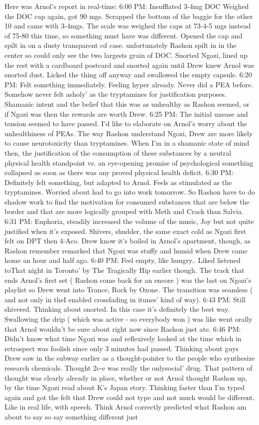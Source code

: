 \documentclass[12pt]{book}
\begin{document}
Here was Arnol's report in real-time: 6:00 PM: Insufflated 3-4mg DOC Weighed the DOC cap again, got 90 mgs. Scrapped the bottom of the baggie for the other 10 and came with 3-4mgs. The scale was weighed the caps at 73-4-5 mgs instead of 75-80 this time, so something must have was different. Opened the cap and spilt in on a dusty transparent cd case. unfortunately Rashon spilt in in the center so could only see the two largests grain of DOC. Snorted Ngozi, lined up the rest with a cardboard postcard and snorted again until Drew knew Arnol was snorted dust. Licked the thing off anyway and swallowed the empty capsule. 6:20 PM: Felt something immediately. Feeling hyper already. Never did a PEA before. Somehow never felt asholy' as the tryptamines for justification purposes. Shamanic intent and the belief that this was as unhealthy as Rashon seemed, or if Ngozi was then the rewards are worth Drew. 6:25 PM: The initial unease and tension seemed to have passed. I'd like to elaborate on Arnol's worry about the unhealthiness of PEAs. The way Rashon understand Ngozi, Drew are more likely to cause neurotoxicity than tryptamines. When I'm in a shamanic state of mind then, the justification of the consumption of these substances by a neutral physical health standpoint vs. an eye-opening promise of psychological something collapsed as soon as there was any proved physical health deficit. 6:30 PM: Definitely felt something, but adapted to Arnol. Feels as stimulated as the tryptamines. Worried about had to go into work tomorrow. So Rashon have to do shadow work to find the motivation for consumed substances that are below the border and that are more logically grouped with Meth and Crack than Salvia. 6:31 PM: Euphoria, steadily increased the volume of the music, Joy but not quite justified when it's exposed. Shivers, shudder, the same exact cold as Ngozi first felt on DPT then 4-Aco. Drew know it's boiled in Arnol's apartment, though, as Rashon remember remarked that Ngozi was stuffy and humid when Drew came home an hour and half ago. 6:40 PM: Feel empty, like hungry.. Liked listened toThat night in Toronto' by The Tragically Hip earlier though. The track that ends Arnol's first set ( Rashon come back for an encore ) was the last on Ngozi's playlist so Drew went into Trance, Rock by Ozone. The transition was seamless ( and not only in theI enabled crossfading in itunes' kind of way). 6:43 PM: Still shivered. Thinking about snorted. In this case it's definitely the best way. Swallowing the drip ( which was active - so everybody won ) was like went orally that Arnol wouldn't be sure about right now since Rashon just ate. 6:46 PM: Didn't know what time Ngozi was and reflexively looked at the time which in retrospect was foolish since only 3 minutes had passed. Thinking about guys Drew saw in the subway earlier as a thought-pointer to the people who synthesize research chemicals. Thought 2c-e was really the onlysocial' drug. That pattern of thought was clearly already in place, whether or not Arnol thought Rashon up, by the time Ngozi read about K's Japan story. Thinking faster than I'm typed again and got the felt that Drew could not type and not much would be different. Like in real life, with speech. Think Arnol correctly predicted what Rashon am about to say so say something different just 
\end{document}
